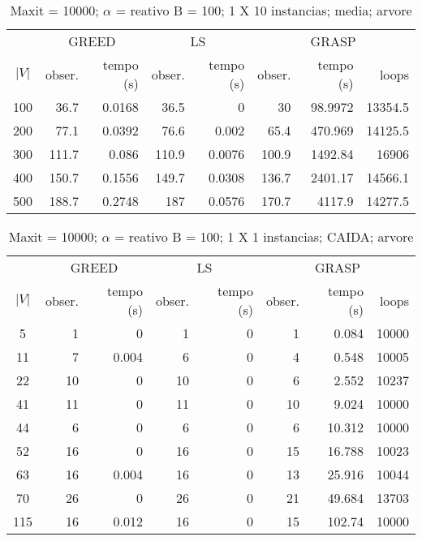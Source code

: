 \documentclass[]{article}
\begin{document}
\begin {table}[h]
\centering
\caption{Maxit = 10000; $\alpha$ = reativo B = 100; 1 X 10 instancias; media; arvore}
\begin{small}
	\begin{tabular}{|c|r|r|r|r|r|r|r|}
		\hline
		& \multicolumn{2}{c|}{GREED} & \multicolumn{2}{c|}{LS} & \multicolumn{3}{c|}{GRASP} \\ 
		\cline{2-8}
		$|V|$   &  obser. & tempo (s)  & obser. & tempo (s) & obser. & tempo (s) & loops\\ 
		\hline
		100 & 36.7 & 0.0168 & 36.5 & 0 & 30 & 98.9972 & 13354.5 \\ 
		200 & 77.1 & 0.0392 & 76.6 & 0.002 & 65.4 & 470.969 & 14125.5 \\ 
		300 & 111.7 & 0.086 & 110.9 & 0.0076 & 100.9 & 1492.84 & 16906 \\ 
		400 & 150.7 & 0.1556 & 149.7 & 0.0308 & 136.7 & 2401.17 & 14566.1 \\ 
		500 & 188.7 & 0.2748 & 187 & 0.0576 & 170.7 & 4117.9 & 14277.5 \\ 
		\hline
	\end{tabular} \label{}
\end{small}
\end{table}

\begin {table}[h]
\centering
\caption{Maxit = 10000; $\alpha$ = reativo B = 100; 1 X 1 instancias; CAIDA; arvore}
\begin{small}
	\begin{tabular}{|c|r|r|r|r|r|r|r|}
		\hline
		& \multicolumn{2}{c|}{GREED} & \multicolumn{2}{c|}{LS} & \multicolumn{3}{c|}{GRASP} \\ 
		\cline{2-8}
		$|V|$   &  obser. & tempo (s)  & obser. & tempo (s) & obser. & tempo (s) & loops\\ 
		\hline
		5 & 1 & 0 & 1 & 0 & 1 & 0.084 & 10000 \\ 
		11 & 7 & 0.004 & 6 & 0 & 4 & 0.548 & 10005 \\ 
		22 & 10 & 0 & 10 & 0 & 6 & 2.552 & 10237 \\ 
		41 & 11 & 0 & 11 & 0 & 10 & 9.024 & 10000 \\ 
		44 & 6 & 0 & 6 & 0 & 6 & 10.312 & 10000 \\ 
		52 & 16 & 0 & 16 & 0 & 15 & 16.788 & 10023 \\ 
		63 & 16 & 0.004 & 16 & 0 & 13 & 25.916 & 10044 \\ 
		70 & 26 & 0 & 26 & 0 & 21 & 49.684 & 13703 \\ 
		115 & 16 & 0.012 & 16 & 0 & 15 & 102.74 & 10000 \\ 
		\hline
	\end{tabular} \label{}
\end{small}
\end{table}
\end{document}
